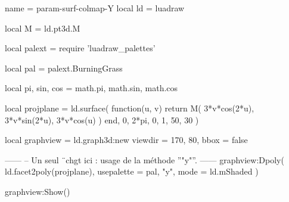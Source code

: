 \documentclass[border = 3pt]{standalone}
\begin{document}
\begin{luadraw*}{name = param-surf-colmap-Y}
local ld = luadraw

local M = ld.pt3d.M

local palext = require 'luadraw_palettes'

local pal = palext.BurningGrass

local pi, sin, cos = math.pi, math.sin, math.cos

local projplane = ld.surface(
  function(u, v)
    return M(
      3*v*cos(2*u),
      3*v*sin(2*u),
      3*v*cos(u)
    )
  end,
  0, 2*pi, 0, 1,
  {50, 30}
)

local graphview = ld.graph3d:new{
  viewdir = {170, 80},
  bbox    = false
}

------
-- Un seul ¨chgt ici : usage de la méthode ''"y"''.
------
graphview:Dpoly(
  ld.facet2poly(projplane),
  {
    usepalette = {pal, "y"},
    mode       = ld.mShaded
  }
)

graphview:Show()
\end{luadraw*}
\end{document}
